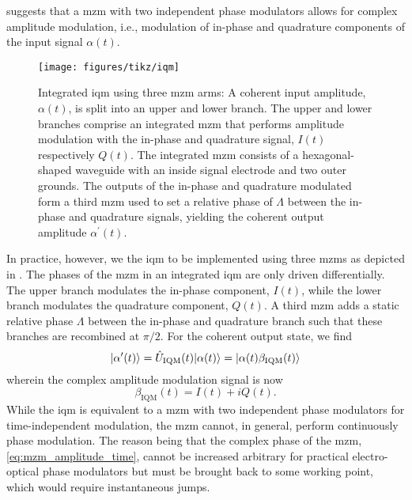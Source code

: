  suggests that a \gls{mzm} with two independent phase modulators allows for complex amplitude modulation, i.e.,  modulation of in-phase and quadrature components of the input signal $\alpha(t)$.
\begin{figure}[htb]
    \centering
    \texttt{[image: figures/tikz/iqm]}
    \caption{Integrated \gls{iqm} using three \gls{mzm} arms: A coherent input amplitude, $\alpha(t)$, is split into an upper and lower branch. The upper and lower branches comprise an integrated \gls{mzm} that performs amplitude modulation with the in-phase and quadrature signal, $I(t)$ respectively $Q(t)$. The integrated \gls{mzm} consists of a hexagonal-shaped waveguide with an inside signal electrode and two outer grounds. The outputs of the in-phase and quadrature modulated form a third \gls{mzm} used to set a relative phase of $\Lambda$ between the in-phase and quadrature signals, yielding the coherent output amplitude $\alpha^\prime(t)$.}\label{fig:iqm}
\end{figure}
In practice, however, we the \gls{iqm} to be implemented using three \gls{mzm}s as depicted in .
The phases of the \gls{mzm} in an integrated \gls{iqm} are only driven differentially.
The upper branch modulates the in-phase component, $I(t)$, while the lower branch modulates the quadrature component, $Q(t)$.
A third \gls{mzm} adds a static relative phase $\Lambda$ between the in-phase and quadrature branch such that these branches are recombined at $\pi/2$.
For the coherent output state, we find
\begin{equation}
	\ket*{\alpha^\prime(t)}
	=
	\hat{U}_\text{IQM}(t)
	\ket*{\alpha(t)}
	=
	\ket*{\alpha(t)\beta_\text{IQM}(t)}
\end{equation}
wherein the complex amplitude modulation signal is now
\begin{equation}
	\beta_\text{IQM}(t)
	=
	I(t)
	+
	iQ(t)
	\label{eq:iqm_modulation}
	.
\end{equation}
While the \gls{iqm} is equivalent to a \gls{mzm} with two independent phase modulators for time-independent modulation, the \gls{mzm} cannot, in general, perform continuously phase modulation.
The reason being that the complex phase of the \gls{mzm}, \cref{eq:mzm_amplitude_time}, cannot be increased arbitrary for practical electro-optical phase modulators but must be brought back to some working point, which would require instantaneous jumps.